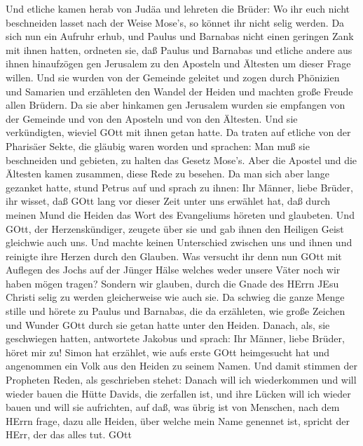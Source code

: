  Und etliche kamen herab von Judäa und lehreten die Brüder:
Wo ihr euch nicht beschneiden lasset nach der Weise Mose's, so könnet
ihr nicht selig werden.  Da sich nun ein Aufruhr erhub, und
Paulus und Barnabas nicht einen geringen Zank mit ihnen hatten, ordneten
sie, daß Paulus und Barnabas und etliche andere aus ihnen hinaufzögen
gen Jerusalem zu den Aposteln und Ältesten um dieser Frage willen.
 Und sie wurden von der Gemeinde geleitet und zogen durch
Phönizien und Samarien und erzähleten den Wandel der Heiden und machten
große Freude allen Brüdern.  Da sie aber hinkamen gen
Jerusalem wurden sie empfangen von der Gemeinde und von den Aposteln und
von den Ältesten. Und sie verkündigten, wieviel GOtt mit ihnen getan
hatte.  Da traten auf etliche von der Pharisäer Sekte, die
gläubig waren worden und sprachen: Man muß sie beschneiden und gebieten,
zu halten das Gesetz Mose's.  Aber die Apostel und die
Ältesten kamen zusammen, diese Rede zu besehen.  Da man sich
aber lange gezanket hatte, stund Petrus auf und sprach zu ihnen: Ihr
Männer, liebe Brüder, ihr wisset, daß GOtt lang vor dieser Zeit unter
uns erwählet hat, daß durch meinen Mund die Heiden das Wort des
Evangeliums höreten und glaubeten.  Und GOtt, der
Herzenskündiger, zeugete über sie und gab ihnen den Heiligen Geist
gleichwie auch uns.  Und machte keinen Unterschied zwischen
uns und ihnen und reinigte ihre Herzen durch den Glauben. 
Was versucht ihr denn nun GOtt mit Auflegen des Jochs auf der Jünger
Hälse welches weder unsere Väter noch wir haben mögen tragen?
 Sondern wir glauben, durch die Gnade des HErrn JEsu
Christi selig zu werden gleicherweise wie auch sie.  Da
schwieg die ganze Menge stille und hörete zu Paulus und Barnabas, die da
erzähleten, wie große Zeichen und Wunder GOtt durch sie getan hatte
unter den Heiden.  Danach, als, sie geschwiegen hatten,
antwortete Jakobus und sprach: Ihr Männer, liebe Brüder, höret mir zu!
 Simon hat erzählet, wie aufs erste GOtt heimgesucht hat
und angenommen ein Volk aus den Heiden zu seinem Namen. 
Und damit stimmen der Propheten Reden, als geschrieben stehet:
 Danach will ich wiederkommen und will wieder bauen die
Hütte Davids, die zerfallen ist, und ihre Lücken will ich wieder bauen
und will sie aufrichten,  auf daß, was übrig ist von
Menschen, nach dem HErrn frage, dazu alle Heiden, über welche mein Name
genennet ist, spricht der HErr, der das alles tut.  GOtt

